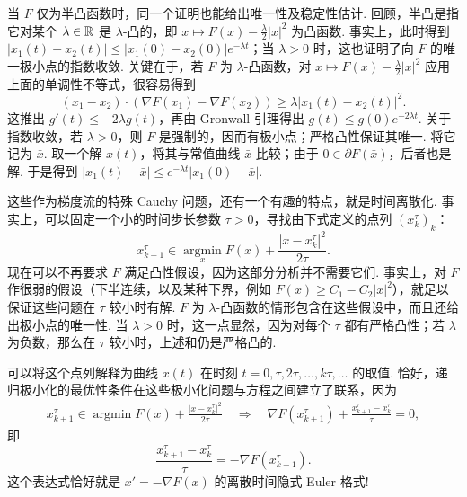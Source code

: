 \begin{remark}\label{obj:8.2}
当 $F$ 仅为半凸函数时，同一个证明也能给出唯一性及稳定性估计. 回顾，半凸是指它对某个 $\lambda\in\mathbb R$ 是 $\lambda$-凸的，即 $x\mapsto F(x)-\frac\lambda2|x|^2$ 为凸函数. 事实上，此时得到
$|x_1(t)-x_2(t)|\leq |x_1(0)-x_2(0)|e^{-\lambda t}$；当 $\lambda>0$ 时，这也证明了向 $F$ 的唯一极小点的指数收敛. 关键在于，若 $F$ 为 $\lambda$-凸函数，对 $x\mapsto F(x)-\frac\lambda2|x|^2$ 应用上面的单调性不等式，很容易得到
\[
(x_1-x_2)\cdot(\nabla F(x_1)-\nabla F(x_2))\geq\lambda|x_1(t)-x_2(t)|^2.
\]
这推出 $g'(t)\leq-2\lambda g(t)$，再由 Gronwall 引理得出 $g(t)\leq g(0)e^{-2\lambda t}$. 关于指数收敛，若 $\lambda>0$，则 $F$ 是强制的，因而有极小点；严格凸性保证其唯一. 将它记为 $\bar x$. 取一个解 $x(t)$，将其与常值曲线 $\bar x$ 比较；由于 $0\in\partial F(\bar x)$，后者也是解. 于是得到 $|x_1(t)-\bar x|\leq e^{-\lambda t}|x_1(0)-\bar x|$.
\end{remark}

这些作为梯度流的特殊 Cauchy 问题，还有一个有趣的特点，就是时间离散化. 事实上，可以固定一个小的时间步长参数 $\tau>0$，寻找由下式定义的点列 $(x_k^\tau)_k$：
\[
x_{k+1}^\tau\in\operatorname*{argmin}_x F(x)+\frac{|x-x_k^\tau|^2}{2\tau}.
\]
现在可以不再要求 $F$ 满足凸性假设，因为这部分分析并不需要它们. 事实上，对 $F$ 作很弱的假设（下半连续，以及某种下界，例如 $F(x)\geq C_1-C_2|x|^2$），就足以保证这些问题在 $\tau$ 较小时有解. $F$ 为 $\lambda$-凸函数的情形包含在这些假设中，而且还给出极小点的唯一性. 当 $\lambda>0$ 时，这一点显然，因为对每个 $\tau$ 都有严格凸性；若 $\lambda$ 为负数，那么在 $\tau$ 较小时，上述和仍是严格凸的.

可以将这个点列解释为曲线 $x(t)$ 在时刻 $t=0,\tau,2\tau,\ldots,k\tau,\ldots$ 的取值. 恰好，递归极小化的最优性条件在这些极小化问题与方程之间建立了联系，因为
\[
\begin{aligned}
x_{k+1}^\tau\in\operatorname*{argmin} F(x)+\frac{|x-x_k^\tau|^2}{2\tau}
\quad\Longrightarrow\quad
\nabla F(x_{k+1}^\tau)+\frac{x_{k+1}^\tau-x_k^\tau}{\tau}=0,
\end{aligned}
\]
即
\[
\frac{x_{k+1}^\tau-x_k^\tau}{\tau}=-\nabla F(x_{k+1}^\tau).
\]
这个表达式恰好就是 $x'=-\nabla F(x)$ 的离散时间隐式 Euler 格式!


